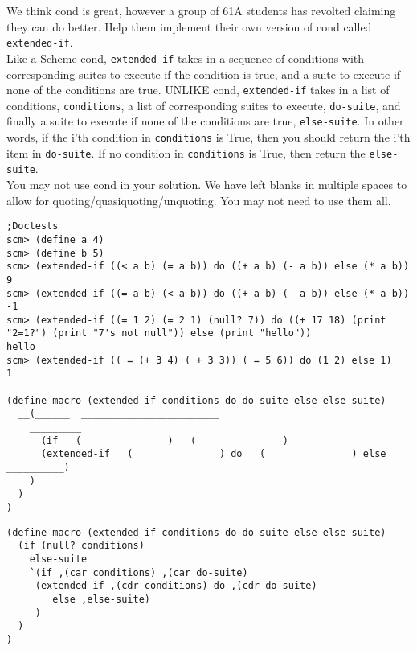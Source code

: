 \begin{blocksection}
\question
We think cond is great, however a group of 61A students has revolted claiming they can do better. Help them implement their own version of cond called \lstinline{extended-if}.
\\
Like a Scheme cond, \lstinline{extended-if} takes in a sequence of conditions with corresponding suites to execute if the condition is true, and a suite to execute if none of the conditions are true. UNLIKE cond, \lstinline{extended-if} takes in a list of conditions, \lstinline{conditions}, a list of corresponding suites to execute, \lstinline{do-suite}, and finally a suite to execute if none of the conditions are true, \lstinline{else-suite}. In other words, if the i’th condition in \lstinline{conditions} is True, then you should return the i’th item in \lstinline{do-suite}. If no condition in \lstinline{conditions} is True, then return the \lstinline{else-suite}.
\\
You may not use cond in your solution. We have left blanks in multiple spaces to allow for quoting/quasiquoting/unquoting. You may not need to use them all.
\\
\begin{lstlisting}
;Doctests
scm> (define a 4)
scm> (define b 5)
scm> (extended-if ((< a b) (= a b)) do ((+ a b) (- a b)) else (* a b))
9
scm> (extended-if ((= a b) (< a b)) do ((+ a b) (- a b)) else (* a b))
-1
scm> (extended-if ((= 1 2) (= 2 1) (null? 7)) do ((+ 17 18) (print "2=1?") (print "7's not null")) else (print "hello"))
hello
scm> (extended-if (( = (+ 3 4) ( + 3 3)) ( = 5 6)) do (1 2) else 1)
1

(define-macro (extended-if conditions do do-suite else else-suite)
  __(______  ________________________
    _________
    __(if __(_______ _______) __(_______ _______)
    __(extended-if __(_______ _______) do __(_______ _______) else __________)
    )
  )
)
\end{lstlisting}
\end{blocksection}

\begin{solution}
\begin{blocksection}
\begin{lstlisting}
(define-macro (extended-if conditions do do-suite else else-suite)
  (if (null? conditions)
    else-suite
    `(if ,(car conditions) ,(car do-suite)
     (extended-if ,(cdr conditions) do ,(cdr do-suite)
        else ,else-suite)
     )
  )
)
\end{lstlisting}
\end{blocksection}
\end{solution}
